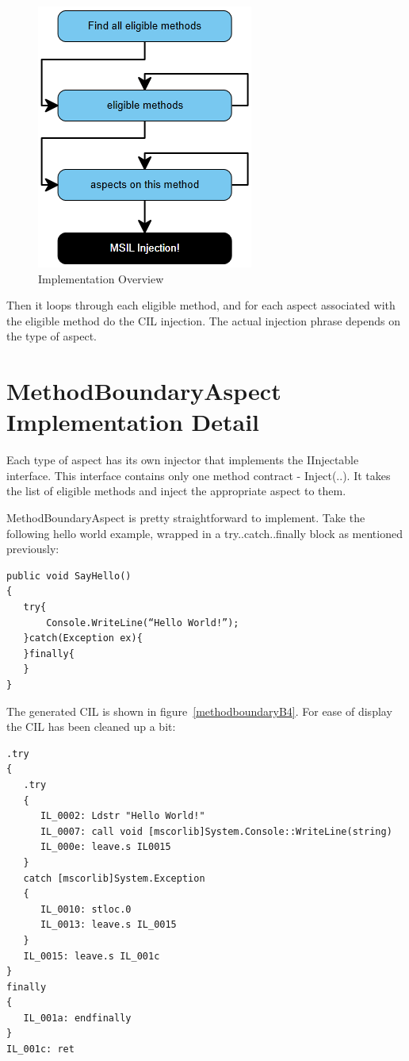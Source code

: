 \begin{figure}[H]
  \includegraphics[scale=1.0]{ImplementationOverview3.PNG}
  \centering
  \caption{Implementation Overview\label{implementation_overview}}
\end{figure}

Then it loops through each eligible method, and for each aspect associated with the eligible method do the CIL injection. The actual injection phrase depends on the type of aspect.

\section{MethodBoundaryAspect Implementation Detail}

Each type of aspect has its own injector that implements the IInjectable interface. This interface contains only one method contract - Inject(..). It takes the list of eligible methods and inject the appropriate aspect to them.

MethodBoundaryAspect is pretty straightforward to implement. Take the following hello world example, wrapped in a try..catch..finally block as mentioned previously:

\begin{lstlisting}[caption={SayHello function}, label=sayhello]
public void SayHello()
{
   try{
       Console.WriteLine(“Hello World!”);
   }catch(Exception ex){
   }finally{
   }
}
\end{lstlisting}

The generated CIL is shown in figure~\ref{methodboundaryB4}. For ease of display the CIL has been cleaned up a bit:

\begin{lstlisting}[caption={CIL generated for sample C\# function}, label=methodboundaryB4]
.try
{
   .try
   {
      IL_0002: Ldstr "Hello World!"
      IL_0007: call void [mscorlib]System.Console::WriteLine(string)
      IL_000e: leave.s IL0015
   }
   catch [mscorlib]System.Exception
   {
      IL_0010: stloc.0
      IL_0013: leave.s IL_0015
   }
   IL_0015: leave.s IL_001c
}
finally
{
   IL_001a: endfinally
}
IL_001c: ret
\end{lstlisting}

